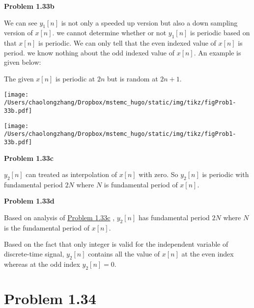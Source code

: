 \documentclass[koma,a4paper,utopia,12pt,listings-color,microtype,paralist,colorlinks,urlcolor=red]{org-article}
\begin{document}
\textbf{Problem 1.33b}

We can see \(y_{1}[n]\) is not only a speeded up version but also a down
sampling version of \(x[n]\). we cannot determine whether or not \(y_{1}[n]\)
is periodic based on that \(x[n]\) is periodic. We can only tell that the even
indexed value of \(x[n]\) is period. we know nothing about the odd indexed value
of \(x[n]\). An example is given below:

The given \(x[n]\) is periodic at \(2n\) but is random at \(2n+1\).
\begin{center}
\texttt{[image: /Users/chaolongzhang/Dropbox/mstemc\_hugo/static/img/tikz/figProb1-33b.pdf]}
\end{center}


\begin{center}
\texttt{[image: /Users/chaolongzhang/Dropbox/mstemc\_hugo/static/img/tikz/figProb1-33b.pdf]}
\end{center}

\textbf{Problem 1.33c} \label{Problem 1.33c}

\(y_{2}[n]\) can treated as interpolation of \(x[n]\) with zero. So \(y_{2}[n]\)
is periodic with fundamental period \(2N\) where \(N\) is fundamental period of
\(x[n]\).

\textbf{Problem 1.33d}

Based on analysis of \hyperref[Problem 1.33c]{Problem 1.33c} , \(y_{2}[n]\) has fundamental period \(2N\)
where \(N\) is the fundamental period of \(x[n]\).

Based on the fact that only integer is valid for the independent variable of
discrete-time signal, \(y_{2}[n]\) contains all the value of \(x[n]\) at the
even index whereas at the odd index \(y_{2}[n]= 0\).
\section{Problem 1.34}
\label{sec:orgb3a8c01}
\end{document}
